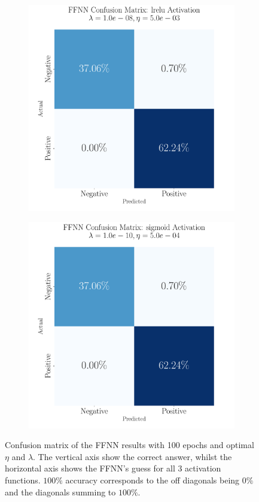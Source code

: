 \documentclass[%
reprint,s
amsmath,amssymb,
aps,
]{revtex4-2}
\begin{document}
\begin{figure}[b]
\begin{subfigure}{0.325\textwidth}
		\includegraphics[width=\textwidth]{Figures/ConfusionMatrixFFNN_lrelu_Epochs100_randomstate42.pdf}
	\end{subfigure}
	\hfill
	\begin{subfigure}{0.325\textwidth}
		\includegraphics[width=\textwidth]{Figures/ConfusionMatrixFFNN_sigmoid_Epochs100_randomstate42.pdf}
	\end{subfigure}
	\caption{Confusion matrix of the FFNN results with 100 epochs and optimal $\eta$ and $\lambda$. The vertical axis show the correct answer, whilst the horizontal axis shows the FFNN's guess for all 3 activation functions. $100\%$ accuracy corresponds to the off diagonals being $0\%$ and the diagonals summing to $100\%$.}
	\label{fig:Confusion_FFNN}
\end{figure}
\end{document}
